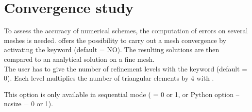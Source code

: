 \section{Convergence study}

To assess the accuracy of numerical schemes, the computation of errors
on several meshes is needed.
 offers the possibility to carry out a mesh convergence
by activating the keyword  (default = NO).
The resulting solutions are then compared to an analytical solution
on a fine mesh.\\

The user has to give the number of refinement levels with the keyword
 (default = 0).
Each level multiplies the number of triangular elements by 4 with \stbtel.

This option is only available in sequential mode
( = 0 or 1, or Python option --ncsize = 0 or 1).
